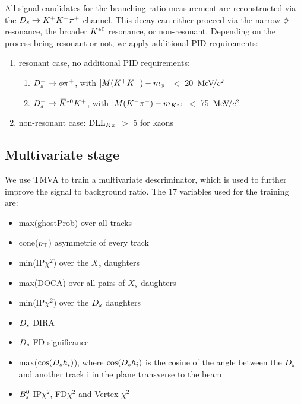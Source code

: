 All signal candidates for the branching ratio measurement are reconstructed via the ${{D}_{s}}\rightarrow{\ensuremath{{K}^+}}{\ensuremath{{K}^-}}{\ensuremath{{\pi}^+}}$ channel. This decay can either proceed via the narrow $\phi$ resonance, the broader ${{K}^{*0}}$ resonance, or non-resonant.
Depending on the process being resonant or not, we apply additional PID requirements:

\begin{enumerate}

\item resonant case, no additional PID requirements:
\begin{enumerate}
\item ${{D}^+_{s}}\rightarrow\phi{\ensuremath{{\pi}^+}}$, with $|M({{K}^+}{{K}^-}) - m_{\phi}|$ $<$ 20 ${\mathrm{\,Me\kern -0.1em V\!/}c^2}$  
\item ${{D}^+_{s}}\rightarrow{\ensuremath{{\kern 0.2em\overline{\kern -0.2em K}{}}{}^{*0}}}{\ensuremath{{K}^+}}$, with  $|M({{K}^-}{{\pi}^+}) -m_{{{K}^{*0}}}$ $<$ 75 ${\mathrm{\,Me\kern -0.1em V\!/}c^2}$
\end{enumerate}

\item non-resonant case: $\mathrm{DLL}_{{K}{\pi}}$ $>$ 5 for kaons

\end{enumerate}




\subsection{Multivariate stage}

We use TMVA \cite{Hocker:2007ht} to train a multivariate descriminator, which is used to further improve the signal to background ratio. The 17 variables used for the training are:

\begin{itemize} 

\item max(ghostProb) over all tracks

\item cone($\mbox{$p_{\mathrm{ T}}$}$) asymmetrie of every track

\item min(IP$\chi^{2}$) over the $X_{s}$ daughters

\item max(DOCA) over all pairs of $X_{s}$ daughters

\item min(IP$\chi^{2}$) over the ${{D}_{s}}$ daughters

\item ${{D}_{s}}$ DIRA

\item ${{D}_{s}}$ FD significance

\item max($\cos({{D}_{s}} h_{i})$), where $\cos({{D}_{s}} h_{i})$ is the cosine of the angle between the ${{D}_{s}}$ and another track i in the plane transverse to the beam

\item ${{B}^0_{s}}$ IP$\chi^{2}$, FD$\chi^{2}$ and Vertex $\chi^{2}$

\end{itemize}

